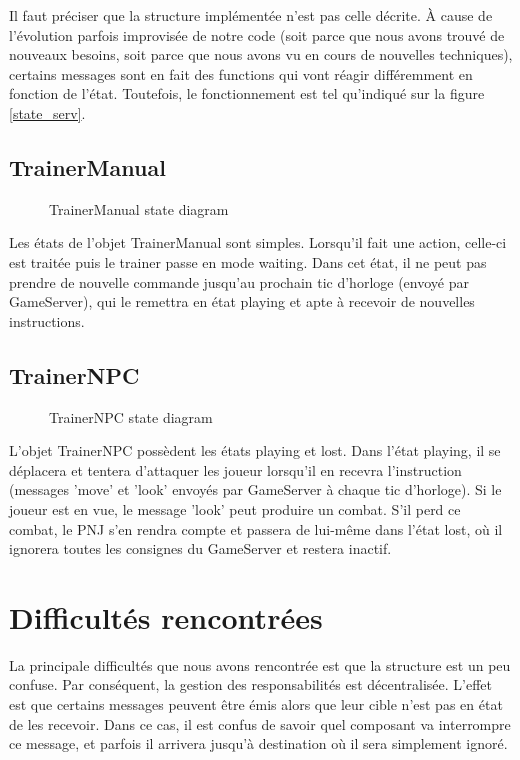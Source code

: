 \documentclass[a4paper,10pt]{article}
\begin{document}
Il faut préciser que la structure implémentée n'est pas celle décrite. À cause de l'évolution parfois improvisée de notre code (soit parce que nous avons trouvé de nouveaux besoins, soit parce que nous avons vu en cours de nouvelles techniques), certains messages sont en fait des functions qui vont réagir différemment en fonction de l'état. Toutefois, le fonctionnement est tel qu'indiqué sur la figure \ref{state_serv}.

\subsection{TrainerManual}

\begin{figure}[!h]
	\label{state_player}
	\caption{TrainerManual state diagram}
\end{figure}

Les états de l'objet TrainerManual sont simples. Lorsqu'il fait une action, celle-ci est traitée puis le trainer passe en mode waiting. Dans cet état, il ne peut pas prendre de nouvelle commande jusqu'au prochain tic d'horloge (envoyé par GameServer), qui le remettra en état playing et apte à recevoir de nouvelles instructions.

\subsection{TrainerNPC}

\begin{figure}[!h]
	\label{state_npc}
	\caption{TrainerNPC state diagram}
\end{figure}

L'objet TrainerNPC possèdent les états playing et lost. Dans l'état playing, il se déplacera et tentera d'attaquer les joueur lorsqu'il en recevra l'instruction (messages 'move' et 'look' envoyés par GameServer à chaque tic d'horloge). Si le joueur est en vue, le message 'look' peut produire un combat. S'il perd ce combat, le PNJ s'en rendra compte et passera de lui-même dans l'état lost, où il ignorera toutes les consignes du GameServer et restera inactif.


\section{Difficultés rencontrées}

La principale difficultés que nous avons rencontrée est que la structure est un peu confuse. Par conséquent, la gestion des responsabilités est décentralisée. L'effet est que certains messages peuvent être émis alors que leur cible n'est pas en état de les recevoir. Dans ce cas, il est confus de savoir quel composant va interrompre ce message, et parfois il arrivera jusqu'à destination où il sera simplement ignoré.
\end{document}

